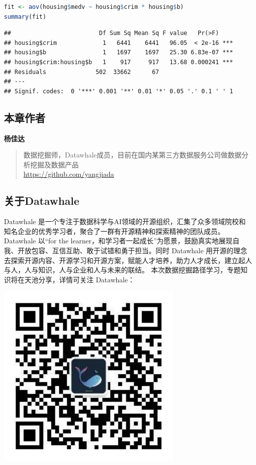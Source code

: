 \documentclass[]{ctexbook}
\begin{document}
\begin{lstlisting}[language=R]
fit <- aov(housing$medv ~ housing$crim * housing$b)
summary(fit)
\end{lstlisting}

\begin{lstlisting}
##                         Df Sum Sq Mean Sq F value   Pr(>F)    
## housing$crim             1   6441    6441   96.05  < 2e-16 ***
## housing$b                1   1697    1697   25.30 6.83e-07 ***
## housing$crim:housing$b   1    917     917   13.68 0.000241 ***
## Residuals              502  33662      67                     
## ---
## Signif. codes:  0 '***' 0.001 '**' 0.01 '*' 0.05 '.' 0.1 ' ' 1
\end{lstlisting}

\hypertarget{ux672cux7ae0ux4f5cux8005-3}{%
\subsection*{本章作者}\label{ux672cux7ae0ux4f5cux8005-3}}


\textbf{杨佳达}

\begin{quote}
数据挖掘师，Datawhale成员，目前在国内某第三方数据服务公司做数据分析挖掘及数据产品\\
\url{https://github.com/yangjiada}
\end{quote}

\hypertarget{ux5173ux4e8edatawhale-3}{%
\subsection*{关于Datawhale}\label{ux5173ux4e8edatawhale-3}}


Datawhale 是一个专注于数据科学与AI领域的开源组织，汇集了众多领域院校和知名企业的优秀学习者，聚合了一群有开源精神和探索精神的团队成员。Datawhale 以``for the learner，和学习者一起成长''为愿景，鼓励真实地展现自我、开放包容、互信互助、敢于试错和勇于担当。同时 Datawhale 用开源的理念去探索开源内容、开源学习和开源方案，赋能人才培养，助力人才成长，建立起人与人，人与知识，人与企业和人与未来的联结。 本次数据挖掘路径学习，专题知识将在天池分享，详情可关注 Datawhale：

\includegraphics[width=3.58in]{image/logo}
\end{document}
